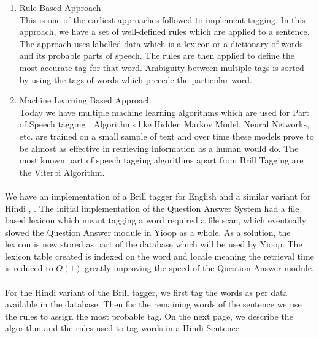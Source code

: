 \begin{enumerate}
\item Rule Based Approach \\
This is one of the earliest approaches followed to implement tagging. In this approach, we have a set of well-defined rules which are applied to a sentence. The approach uses labelled data which is a lexicon or a dictionary of words and its probable parts of speech. 
The rules are then applied to define the most accurate tag for that word. Ambiguity between multiple tags is sorted by using the tags of words which precede the particular word.
	
\item Machine Learning Based Approach \\
Today we have multiple machine learning algorithms which are used for Part of Speech tagging  \cite {brill1999unsupervised}. Algorithms like Hidden Markov Model, Neural Networks, etc. are trained on a small sample of text and over time these models prove to be almost as effective in retrieving information as a human would do. The most known part of speech tagging algorithms apart from Brill Tagging are the Viterbi Algorithm.
\end{enumerate}

\paragraph{}
We have an implementation of a Brill tagger for English and a similar variant for Hindi \cite {garg2012rule}, \cite {dalal2006hindi}.  The initial implementation of the Question Answer System had a file based lexicon which meant tagging a word required a file scan, which eventually  slowed the Question Answer module in Yioop as a whole. As a solution, the lexicon is now stored as part of the database which will be used by Yioop. The lexicon table created is indexed on the word and locale meaning the retrieval time is reduced to $O(1)$ greatly improving the speed of the Question Answer module. 

\paragraph{}
For the Hindi variant of the Brill tagger, we first tag the words as per data available in the database. Then for the remaining words of the sentence we use the rules to assign the most probable tag. On the next page, we describe the algorithm and the rules used to tag words in a Hindi Sentence.  \\

